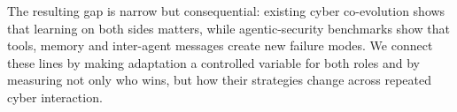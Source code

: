 The resulting gap is narrow but consequential: existing cyber co-evolution
shows that learning on both sides matters, while agentic-security benchmarks
show that tools, memory and inter-agent messages create new failure modes. We
connect these lines by making adaptation a controlled variable for both roles
and by measuring not only who wins, but how their strategies change across
repeated cyber interaction.
